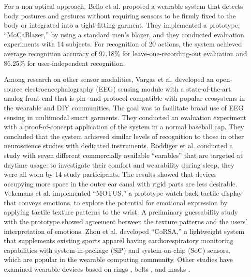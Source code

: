 \documentclass{ieeeaccess}
\begin{document}
For a non-optical approach, Bello et al. \cite{MoCapaci} proposed a wearable system that detects body postures and gestures without requiring sensors to be firmly fixed to the body or integrated into a tight-fitting garment. They implemented a prototype, ``MoCaBlazer,'' by using a standard men's blazer, and they conducted evaluation experiments with 14 subjects. For recognition of 20 actions, the system achieved average recognition accuracy of 97.18\% for leave-one-recording-out evaluation and 86.25\% for user-independent recognition.\par

Among research on other sensor modalities, Vargas et al. \cite{Brainwear} developed an open-source electroencephalography (EEG) sensing module with a state-of-the-art analog front end that is pin- and protocol-compatible with popular ecosystems in the wearable and DIY communities. The goal was to facilitate broad use of EEG sensing in multimodal smart garments. They conducted an evaluation experiment with a proof-of-concept application of the system in a normal baseball cap. They concluded that the system achieved similar levels of recognition to those in other neuroscience studies with dedicated instruments. R\"{o}ddiger et al. \cite{earables} conducted a study with seven different commercially available ``earables'' that are targeted at daytime usage: to investigate their comfort and wearability during sleep, they were all worn by 14 study participants. The results showed that devices occupying more space in the outer ear canal with rigid parts are less desirable. Vekemans et al. \cite{MOTUS} implemented ``MOTUS,'' a prototype watch-back tactile display that conveys emotions, to explore the potential for emotional expression by applying tactile texture patterns to the wrist. A preliminary guessability study with the prototype showed agreement between the texture patterns and the users' interpretation of emotions. Zhou et al. \cite{CoRSA} developed ``CoRSA,'' a lightweight system that supplements existing sports apparel having cardiorespiratory monitoring capabilities with system-in-package (SiP) and system-on-chip (SoC) sensors, which are popular in the wearable computing community. Other studies have examined wearable devices based on rings \cite{wearable_ring1, wearable_ring2, TypingRing, ElectroRing}, belts \cite{wearable_belt1, SmartBelt, WaistonBeltX, wearable_belt2}, and masks \cite{wearable_mask1, wearable_mask2, SilentMask, Masquare}.\par
\end{document}
